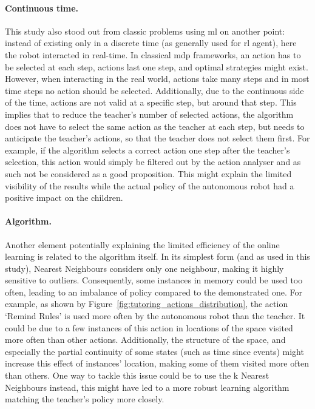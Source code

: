 
\paragraph{Continuous time.}

This study also stood out from classic problems using \gls{ml} on another point: instead of existing only in a discrete time (as generally used for \gls{rl} agent), here the robot interacted in real-time. In classical \gls{mdp} frameworks, an action has to be selected at each step, actions last one step, and optimal strategies might exist. However, when interacting in the real world, actions take many steps and in most time steps no action should be selected. Additionally, due to the continuous side of the time, actions are not valid at a specific step, but around that step. This implies that to reduce the teacher's number of selected actions, the algorithm does not have to select the same action as the teacher at each step, but needs to anticipate the teacher's actions, so that the teacher does not select them first. For example, if the algorithm selects a correct action one step after the teacher's selection, this action would simply be filtered out by the action analyser and as such not be considered as a good proposition. This might explain the limited visibility of the results while the actual policy of the autonomous robot had a positive impact on the children.


\paragraph{Algorithm.}

Another element potentially explaining the limited efficiency of the online learning is related to the algorithm itself. In its simplest form (and as used in this study), Nearest Neighbours considers only one neighbour, making it highly sensitive to outliers. Consequently, some instances in memory could be used too often, leading to an imbalance of policy compared to the demonstrated one. For example, as shown by Figure~\ref{fig:tutoring_actions_distribution}, the action `Remind Rules' is used more often by the autonomous robot than the teacher. It could be due to a few instances of this action in locations of the space visited more often than other actions. Additionally, the structure of the space, and especially the partial continuity of some states (such as time since events) might increase this effect of instances' location, making some of them visited more often than others. One way to tackle this issue could be to use the k Nearest Neighbours instead, this might have led to a more robust learning algorithm matching the teacher's policy more closely.

